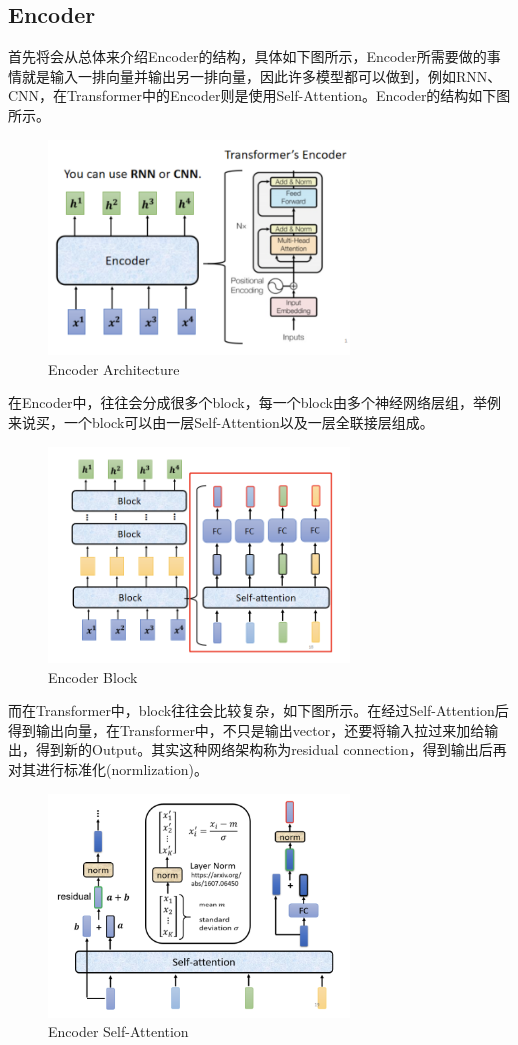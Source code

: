 \documentclass{article}
\begin{document}
\subsection{Encoder}
\indent 首先将会从总体来介绍Encoder的结构，具体如下图所示，Encoder所需要做的事情就是输入一排向量并输出另一排向量，因此许多模型都可以做到，例如RNN、CNN，在Transformer中的Encoder则是使用Self-Attention。Encoder的结构如下图所示。 \par
\begin{figure}[H]
    \centering
    \includegraphics[width=8cm]{picture/Encoder.png}
    \caption{Encoder Architecture}
    \label{fig:galxy}
\end{figure}
\indent 在Encoder中，往往会分成很多个block，每一个block由多个神经网络层组，举例来说买，一个block可以由一层Self-Attention以及一层全联接层组成。 \par
\begin{figure}[H]
    \centering
    \includegraphics[width=8cm]{picture/EncoderBlock.png}
    \caption{Encoder Block}
    \label{fig:galxy}
\end{figure}
\indent 而在Transformer中，block往往会比较复杂，如下图所示。在经过Self-Attention后得到输出向量，在Transformer中，不只是输出vector，还要将输入拉过来加给输出，得到新的Output。其实这种网络架构称为residual connection，得到输出后再对其进行标准化(normlization)。 \par
\begin{figure}[H]
    \centering
    \includegraphics[width=8cm]{picture/EncoderSelfAttention.png}
    \caption{Encoder Self-Attention}
    \label{fig:galxy}
\end{figure}
\end{document}
